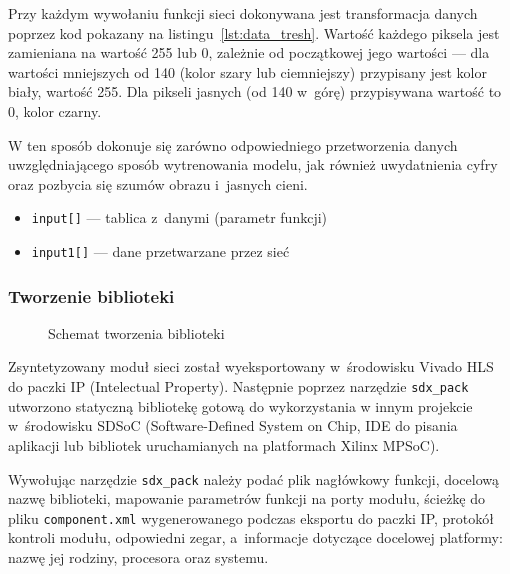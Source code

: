\documentclass[12pt, oneside, a4paper]{article}
\begin{document}
Przy każdym wywołaniu funkcji sieci dokonywana jest transformacja
danych poprzez kod pokazany na listingu~\ref{lst:data_tresh}.
Wartość każdego piksela jest zamieniana na wartość 255 lub 0, zależnie
od początkowej jego wartości --- dla wartości mniejszych od 140
(kolor szary lub ciemniejszy) przypisany jest kolor biały, wartość 255.
Dla pikseli jasnych (od 140 w~górę) przypisywana wartość to 0, kolor czarny.

W ten sposób dokonuje się zarówno odpowiedniego przetworzenia danych
uwzględniającego sposób wytrenowania modelu, jak również uwydatnienia
cyfry oraz pozbycia się szumów obrazu i~jasnych cieni.

\hspace{-1cm}
\begin{minipage}{\linewidth}

\begin{itemize}
  \setlength{\itemindent}{3em}
  \item \lstinline[style=hls]{input[]} --- tablica z~danymi (parametr funkcji)
  \item \lstinline[style=hls]{input1[]} --- dane przetwarzane przez sieć
\end{itemize}
\end{minipage}

\subsubsection{Tworzenie biblioteki}
\begin{figure}[h]
  \centering
  
  \caption{Schemat tworzenia biblioteki}\label{fig:ccall}
\end{figure}
Zsyntetyzowany moduł sieci został wyeksportowany w~środowisku Vivado HLS
do paczki IP (Intelectual Property). Następnie poprzez narzędzie
\lstinline{sdx_pack} utworzono statyczną bibliotekę gotową do wykorzystania
w innym projekcie w~środowisku SDSoC (Software-Defined System on Chip,
IDE do pisania aplikacji lub bibliotek uruchamianych na platformach
Xilinx MPSoC).

\begin{minipage}{\linewidth}

\end{minipage}

Wywołując narzędzie \lstinline{sdx_pack} należy podać plik nagłówkowy funkcji,
docelową nazwę biblioteki, mapowanie parametrów funkcji na porty modułu,
ścieżkę do pliku \lstinline{component.xml} wygenerowanego podczas eksportu
do paczki IP, protokół kontroli modułu, odpowiedni zegar, a~informacje
dotyczące docelowej platformy: nazwę jej rodziny, procesora oraz systemu.
\end{document}
